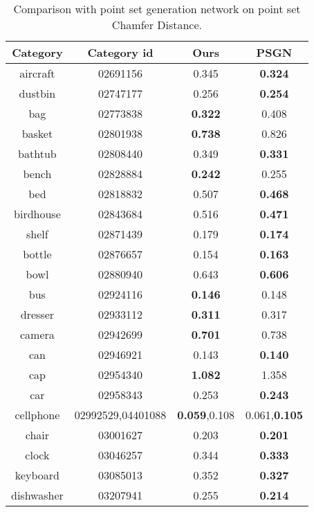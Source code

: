 \begin{table}
	\caption{Comparison with point set generation network on point set Chamfer Distance. }
	\label{tab:seg}
	\centering
	\begin{tabular}{c c c c}
		Category & Category id & Ours & PSGN\citep{PSGN} \\
		\midrule
		aircraft & 02691156 & 0.345 & {\color{green} \textbf{0.324}}\\   
		dustbin & 02747177 & 0.256 & {\color{green} \textbf{0.254}}\\
		bag & 02773838  & {\color{green} \textbf{0.322}} & 0.408\\
		basket & 02801938 & {\color{green}\textbf{0.738}} & 0.826\\
		bathtub & 02808440 & 0.349 & {\color{green}\textbf{0.331}}\\
		bench & 02828884 & {\color{green}\textbf{0.242}} & 0.255\\
		bed & 02818832 & 0.507 & {\color{green}\textbf{0.468}}\\
		birdhouse & 02843684 & 0.516 & {\color{green}\textbf{0.471}}\\
		shelf & 02871439 & 0.179 & {\color{green}\textbf{0.174}}\\
		bottle & 02876657 & 0.154 & {\color{green}\textbf{0.163}}\\
		bowl & 02880940 & 0.643 & {\color{green}\textbf{0.606}}\\
		bus & 02924116 & {\color{green}\textbf{0.146}} & 0.148\\
		dresser & 02933112 & {\color{green}\textbf{0.311}} & 0.317\\
		camera & 02942699 & {\color{green}\textbf{0.701}} & 0.738\\
		can & 02946921 & 0.143 & {\color{green}\textbf{0.140}}\\
		cap & 02954340 & {\color{green} \textbf{1.082}} & 1.358\\
		car & 02958343 & 0.253 & {\color{green} \textbf{0.243}}\\
		cellphone & 02992529,04401088 & {\color{green}\textbf{0.059}},0.108 & 0.061,{\color{green}\textbf{0.105}}\\
		chair & 03001627 & 0.203 & {\color{green}\textbf{0.201}}\\
		clock & 03046257 & 0.344 & {\color{green}\textbf{0.333}}\\
		keyboard & 03085013 & 0.352 & {\color{green}\textbf{0.327}}\\
		dishwasher & 03207941 & 0.255 & {\color{green}\textbf{0.214}}\\

\end{tabular}
\end{table}
